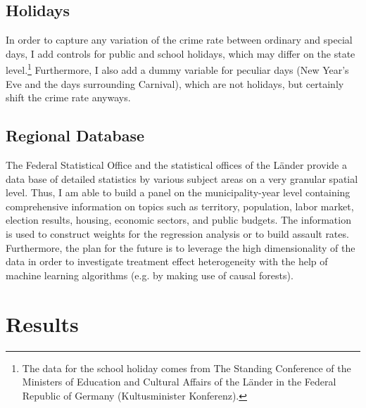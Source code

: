 \documentclass[11pt, a4paper]{article} %
\begin{document}
\subsection{Holidays}
In order to capture any variation of the crime rate between ordinary and special days, I add controls for public and school holidays, which may differ on the state level.\footnote{The data for the school holiday comes from The Standing Conference of the Ministers of Education and Cultural Affairs of the Länder in the Federal Republic of Germany (Kultusminister Konferenz).} Furthermore, I also add a dummy variable for peculiar days (New Year's Eve and the days surrounding Carnival), which are not holidays, but certainly shift the crime rate anyways.



\subsection{Regional Database}
The Federal Statistical Office and the statistical offices of the Länder provide a data base of detailed statistics by various subject areas on a very granular spatial level. Thus, I am able to build a panel on the municipality-year level containing comprehensive information on topics such as territory, population, labor market, election results, housing, economic sectors, and public budgets. The information is used to construct weights for the regression analysis or to build assault rates. Furthermore, the plan for the future is to leverage the high dimensionality of the data in order to investigate treatment effect heterogeneity with the help of machine learning algorithms (e.g. by making use of causal forests). 














\newpage
\section{Results}\label{sec_soc_ext:results}
\end{document}
